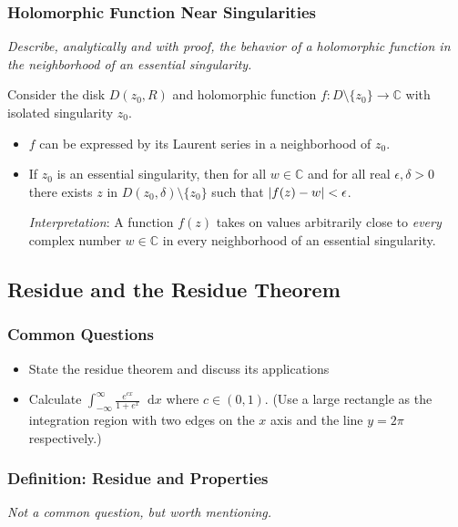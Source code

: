 \documentclass[11pt, a4paper]{article}
\newcommand{\question}[1]{\textit{#1}\vspace{2mm}}
\newcommand{\C}{\mathbb{C}} %
\newcommand{\diff}{\mathop{}\!\mathrm{d}} %
\begin{document}
\subsubsection{Holomorphic Function Near Singularities}
\question{Describe, analytically  and with proof, the behavior of a holomorphic function in the neighborhood of an essential singularity. }

Consider the disk $ D(z_0, R) $ and holomorphic function $ f: D \setminus \{z_{0}\} \to \C $ with isolated singularity $ z_{0} $.
\begin{itemize}
	\item $ f $ can be expressed by its Laurent series in a neighborhood of $ z_0 $.
	
	\item If $ z_0 $ is an essential singularity, then for all $ w \in \C $ and for all real $ \epsilon, \delta > 0 $ there exists $ z $ in $ D(z_0, \delta) \setminus \{z_0 \} $ such that $ \abs{f(z) - w} < \epsilon $.
	
	\textit{Interpretation}: A function $ f(z) $ takes on values arbitrarily close to \textit{every} complex number $ w \in \C $ in every neighborhood of an essential singularity.
	
\end{itemize}



\subsection{Residue and the Residue Theorem}
\subsubsection{Common Questions}
\begin{itemize}
	\item State the residue theorem and discuss its applications
	
	\item Calculate $ \int_{-\infty}^{\infty} \frac{e^{cx}}{1+e^{x}}\diff x $ where $ c \in (0, 1) $. (Use a large rectangle as the integration region with two edges on the $ x $ axis and the line $ y = 2\pi $ respectively.)
\end{itemize}

\subsubsection{Definition: Residue and Properties}
\question{Not a common question, but worth mentioning.}
\end{document}
